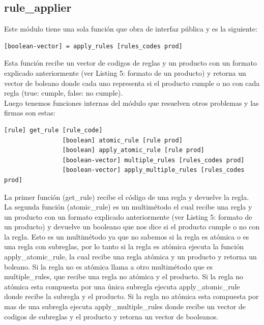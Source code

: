 \documentclass[a4paper, 12pt]{article}
\begin{document}
		\newpage
		\subsection{rule\_applier}
			Este módulo tiene una sola función que obra de interfaz pública y es la siguiente:
			\begin{lstlisting}[frame=tb, caption=firmas de la interfaz pública, label=zebra, tabsize=1]
				[boolean-vector] = apply_rules [rules_codes prod]
			\end{lstlisting}
			Esta función recibe un vector de codigos de reglas y un producto con un formato explicado anteriormente
			(ver Listing 5: formato de un producto) y retorna un vector de boleano donde cada uno representa si el producto cumple 				o no con cada regla (true: cumple, false: no cumple).\\

			Luego tenemos funciones internas del módulo que resuelven otros problemas y las firmas son estas:
			\begin{lstlisting}[frame=tb, caption=firmas de las funciones privadas, label=zebra, tabsize=1]
				[rule] get_rule [rule_code]
				[boolean] atomic_rule [rule prod]
				[boolean] apply_atomic_rule [rule prod]
				[boolean-vector] multiple_rules [rules_codes prod]
				[boolean-vector] apply_multiple_rules [rules_codes prod]
			\end{lstlisting}
			La primer función (get\_rule) recibe el código de una regla y devuelve la regla.\\
			La segunda función (atomic\_rule) es un multimétodo el cual recibe una regla y un producto con un formato explicado 				anteriormente (ver Listing 5: formato de un producto) y devuelve un booleano que nos dice si el producto cumple o no 				con la regla. Esto es un multimétodo ya que no sabemos si la regla es atómica o es una regla con subreglas, por lo tanto
			si la regla es atómica ejecuta la función apply\_atomic\_rule, la cual recibe una regla atómica y un producto y retorna 			un boleano. Si la regla no es atómica llama a otro multimétodo que es multiple\_rules, que recibe una regla no atómica 				y el producto. Si la regla no atómica esta compuesta por una única subregla ejecuta apply\_atomic\_rule donde recibe la 				subregla y el producto. Si la regla no atómica esta compuesta por mas de una subregla ejecuta apply\_multiple\_rules 				donde recibe un vector de codigos de subreglas y el producto y retorna un vector de booleanos.

		\newpage
\end{document}
